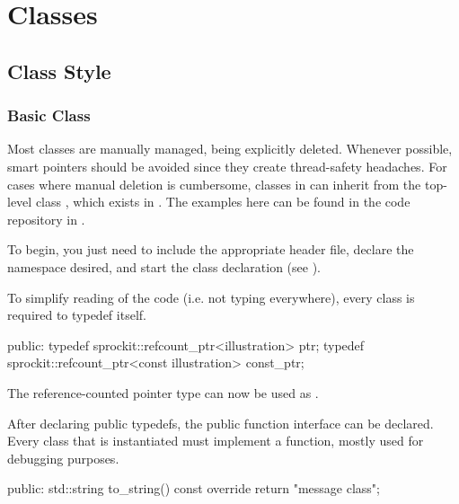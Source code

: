
\chapter{\sstmacro Classes}\label{chapter:classes}

\section{Class Style}\label{sec:style}

\subsection{Basic Class}\label{subsec:basicClass}
Most classes are manually managed, being explicitly deleted.  Whenever possible,
smart pointers should be avoided since they create thread-safety headaches.
For cases where manual deletion is cumbersome, classes in \sstmacro can inherit from the top-level class , 
which exists in . 
The examples here can be found in the code repository in .

To begin, you just need to include the appropriate header file, declare the namespace desired, and start the class declaration (see ).

\begin{CppCode}
#include <sprockit/ptr_type.h>

namespace sstmac {
namespace tutorial {

class illustration :
  public sprockit::ptr_type
{
\end{CppCode}
To simplify reading of the code (i.e. not typing  everywhere), every class is required to typedef itself.

\begin{CppCode}
 public:
  typedef sprockit::refcount_ptr<illustration> ptr;
  typedef sprockit::refcount_ptr<const illustration> const_ptr;
\end{CppCode}
The reference-counted pointer type can now be used as .

After declaring public typedefs, the public function interface can be declared.
Every  class that is instantiated must implement a  function,
mostly used for debugging purposes.

\begin{CppCode}
 public:
  std::string to_string() const override {
    return "message class";
   }
\end{CppCode}

